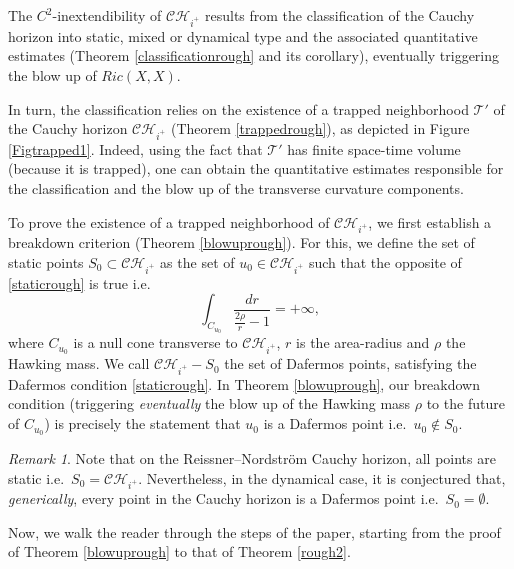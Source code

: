 \documentclass[10pt,a4paper]{article}
\theoremstyle{plain}
\theoremstyle{remark}
\newtheorem{rmk}{Remark}[section]
\theoremstyle{definition}
\theoremstyle{plain}
\theoremstyle{remark}
\theoremstyle{definition}
\newcommand{\CH}{\mathcal{CH}_{i^+}}
\numberwithin{equation}{section}
\begin{document}
The $C^2$-inextendibility of $\CH$ results from the classification of the Cauchy horizon into static, mixed or dynamical type and the associated quantitative estimates (Theorem \ref{classificationrough} and its corollary), eventually triggering the blow up of $Ric(X,X)$. 

In turn, the classification relies on the existence of a trapped neighborhood $\mathcal{T}'$ of the Cauchy horizon $\CH$ (Theorem \ref{trappedrough}), as depicted in Figure \ref{Figtrapped1}. Indeed, using the fact that $\mathcal{T}'$ has finite space-time volume (because it is trapped), one can obtain the quantitative estimates responsible for the classification and the blow up of the transverse curvature components.

To prove the existence of a trapped neighborhood of $\CH$, we first establish a breakdown criterion (Theorem \ref{blowuprough}). For this, we define the set of static points $S_0 \subset \CH$ as the set of $u_0 \in \CH$ such that the opposite of \eqref{staticrough} is true i.e.\ \begin{equation} \label{staticconditionintro}
\int_{C_{u_0}} \frac{dr}{\frac{2\rho}{r}-1} =+\infty,
\end{equation} where $C_{u_0}$ is a null cone transverse to $\CH$, $r$ is the area-radius and $\rho$ the Hawking mass. We call $\CH-S_0$ the set of Dafermos points, satisfying the Dafermos condition \eqref{staticrough}. In Theorem \ref{blowuprough}, our breakdown condition (triggering \textit{eventually} \color{black} the blow up of the Hawking mass $\rho$ to the future of  $C_{u_0}$\color{black}) is precisely the statement that $u_0$ is a Dafermos point i.e.\ $u_0 \notin S_0$. \begin{rmk}
	Note that on the Reissner--Nordstr\"{o}m Cauchy horizon, all points are static i.e.\ $S_0=\CH$. Nevertheless, in the dynamical case, it is conjectured that, \textit{generically}, every point in the Cauchy horizon is a Dafermos point i.e.\ $S_0=\emptyset$.
\end{rmk}

Now, we walk the reader through the steps of the paper, starting from the proof of Theorem \ref{blowuprough} to that of Theorem \ref{rough2}.
\end{document}
